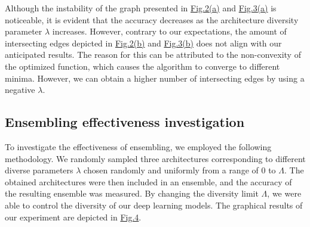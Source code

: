 \documentclass{article}
\begin{document}
Although the instability of the graph presented in \hyperref[fig:graph1fashion]{Fig.2(a)} and \hyperref[fig:graph1CIFAR]{Fig.3(a)} is noticeable, it is evident that the accuracy decreases as the architecture diversity parameter $\lambda$ increases.
However, contrary to our expectations, the amount of intersecting edges depicted in \hyperref[fig:graph2fashion]{Fig.2(b)} and \hyperref[fig:graph2CIFAR]{Fig.3(b)} does not align with our anticipated results.
The reason for this can be attributed to the non-convexity of the optimized function, which causes the algorithm to converge to different minima.
However, we can obtain a higher number of intersecting edges by using a negative $\lambda$.


\subsection{Ensembling effectiveness investigation}

To investigate the effectiveness of ensembling, we employed the following methodology.
We randomly sampled three architectures corresponding to different diverse parameters $\lambda$ chosen randomly and uniformly from a range of 0 to $\Lambda$.
The obtained architectures were then included in an ensemble, and the accuracy of the resulting ensemble was measured.
By changing the diversity limit $\Lambda$, we were able to control the diversity of our deep learning models.
The graphical results of our experiment are depicted in \hyperref[fig:graph4]{Fig.4}.
\end{document}
